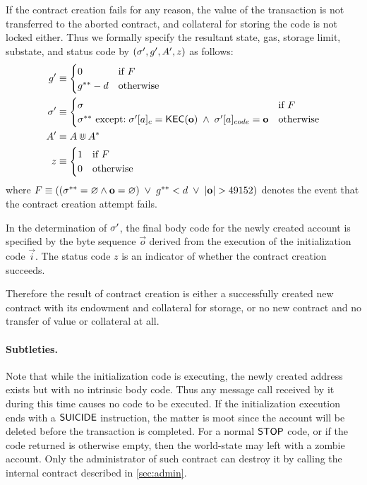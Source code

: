 If the contract creation fails for any reason, the value of the transaction is not transferred to the aborted contract, and collateral for storing the code is not locked either.
Thus we formally specify the resultant state, gas, storage limit, substate, and status code by $\left(\mathbf{\sigma}', g', A', z\right)$ as follows:
\begin{align}
	g' &\equiv \begin{cases}
		0 & \mbox{if $F$}\\
		g^{**}-d & \mbox{otherwise}
	\end{cases} \\
	\mathbf{\sigma}' &\equiv 
	\begin{cases}
		\mathbf{\sigma} 	 	& \mbox{if $F$}\\
		\mathbf{\sigma}^{**} 	\mbox{ except:} 
		\; \mathbf{\sigma}'[a]_c = \mathsf{KEC}(\mathbf{o})\;\land\; \mathbf{\sigma}'[a]_{code} = \mathbf{o}& \mbox{otherwise}
	\end{cases}\\
	A' &\equiv A \Cup A^{*} \\ 
	z &\equiv 
	\begin{cases}
		1	 	& \mbox{if $F$}\\
		0	 	& \mbox{otherwise}
	\end{cases}
\end{align}
where $F\eqdef\left( \left(\st^{**}=\varnothing \land \vec{o}=\varnothing \right)\;\lor\; g^{**}<d \;\lor\;|{\bf o}|>49152 \right)$
denotes the event that the contract creation attempt fails.

In the determination of $\mathbf{\sigma}'$, the final body code for the newly created account is specified by the byte sequence $\vec{o}$ derived from the execution of the initialization code $\vec{i}$.
The status code $z$ is an indicator of whether the contract creation succeeds.

Therefore the result of contract creation is either a successfully created new contract with its endowment and collateral for storage, or no new contract and no transfer of value or collateral at all.

\paragraph{Subtleties.} 
Note that while the initialization code is executing, the newly created address exists but with no intrinsic body code. 
Thus any message call received by it during this time causes no code to be executed. 
If the initialization execution ends with a $\mathsf{SUICIDE}$ instruction, the matter is moot since the account will be deleted before the transaction is completed. 
For a normal $\mathsf{STOP}$ code, or if the code returned is otherwise empty, then the world-state may left with a zombie account. Only the administrator of such contract can destroy it by calling the internal contract described in \cref{sec:admin}.



